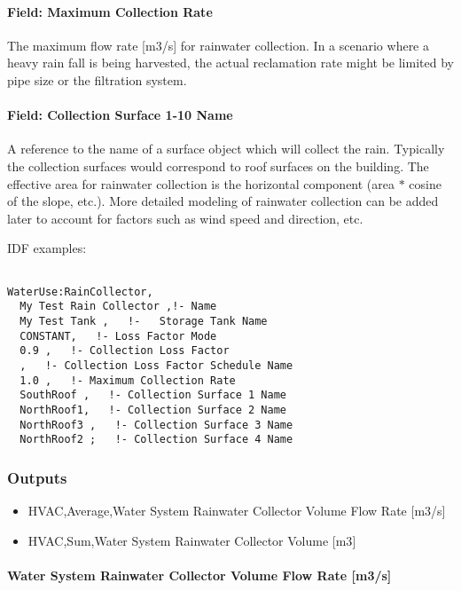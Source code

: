 \paragraph{Field: Maximum Collection Rate}\label{field-maximum-collection-rate}

The maximum flow rate {[}m3/s{]} for rainwater collection. In a scenario where a heavy rain fall is being harvested, the actual reclamation rate might be limited by pipe size or the filtration system.

\paragraph{Field: Collection Surface 1-10 Name}\label{field-collection-surface-1-10-name}

A reference to the name of a surface object which will collect the rain. Typically the collection surfaces would correspond to roof surfaces on the building. The effective area for rainwater collection is the horizontal component (area $*$ cosine of the slope, etc.). More detailed modeling of rainwater collection can be added later to account for factors such as wind speed and direction, etc.

IDF examples:

\begin{lstlisting}

WaterUse:RainCollector,
  My Test Rain Collector ,!- Name
  My Test Tank ,   !-   Storage Tank Name
  CONSTANT,   !- Loss Factor Mode
  0.9 ,   !- Collection Loss Factor
  ,   !- Collection Loss Factor Schedule Name
  1.0 ,   !- Maximum Collection Rate
  SouthRoof ,   !- Collection Surface 1 Name
  NorthRoof1,   !- Collection Surface 2 Name
  NorthRoof3 ,   !- Collection Surface 3 Name
  NorthRoof2 ;   !- Collection Surface 4 Name
\end{lstlisting}

\subsubsection{Outputs}\label{outputs-3-023}

\begin{itemize}
\item
  HVAC,Average,Water System Rainwater Collector Volume Flow Rate {[}m3/s{]}
\item
  HVAC,Sum,Water System Rainwater Collector Volume {[}m3{]}
\end{itemize}

\paragraph{Water System Rainwater Collector Volume Flow Rate {[}m3/s{]}}\label{water-system-rainwater-collector-volume-flow-rate-m3s}

